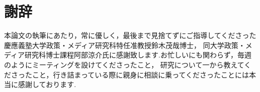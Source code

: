 \chapter*{謝辞}
\label{thanks}

本論文の執筆にあたり，常に優しく，最後まで見捨てずにご指導してくださった慶應義塾大学政策・メディア研究科特任准教授鈴木茂哉博士，
同大学政策・メディア研究科博士課程阿部涼介氏に感謝致します.お忙しいにも関わらず，毎週のようにミーティングを設けてくださったこと，
研究について一から教えてくださったこと，行き詰まっている際に親身に相談に乗ってくださったことには本当に感謝しております.


